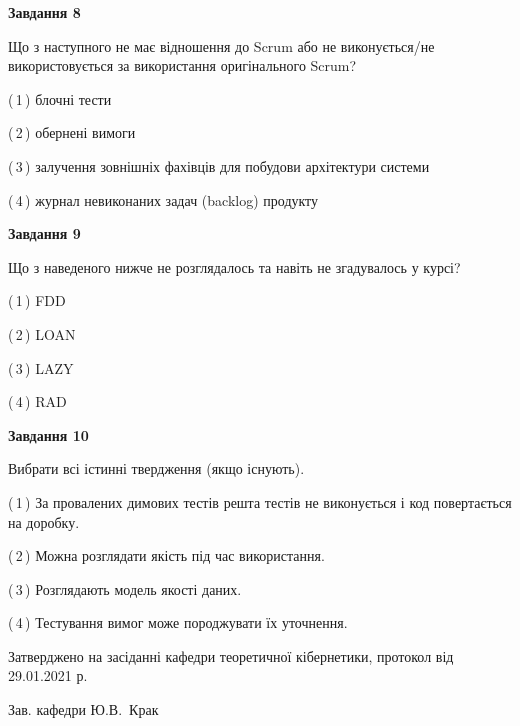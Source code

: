 \documentclass[10pt, ukrainian]{article}
\begin{document}
{\begin {large}
{\begin {center}\textbf{Завдання 8}\end {center}}\par
Що з наступного не має відношення до Scrum або не виконується/не використовується за використання оригінального Scrum?\par
\vspace{2mm}



(\,1\,) блочні тести%



(\,2\,) обернені вимоги%



(\,3\,) залучення зовнішніх фахівців для побудови архітектури системи%



(\,4\,) журнал невиконаних задач (backlog) продукту%


{\begin {center}\textbf{Завдання 9}\end {center}}\par
Що з наведеного нижче не розглядалось та навіть не згадувалось у курсі?\par
\vspace{2mm}



(\,1\,) FDD%



(\,2\,) LOAN%



(\,3\,) LAZY%



(\,4\,) RAD%


{\begin {center}\textbf{Завдання 10}\end {center}}\par
Вибрати всі істинні твердження (якщо існують).\par
\vspace{2mm}



(\,1\,) За провалених димових тестів решта тестів не виконується і код повертається на доробку.%



(\,2\,) Можна розглядати якість під час використання.%



(\,3\,) Розглядають модель якості даних.%



(\,4\,) Тестування вимог може породжувати їх уточнення.%



\end {large}}
{\vspace{5mm}\smallskip \begin {small} Затверджено на засіданні кафедри теоретичної кібернетики, протокол  від   29.01.2021 р.\par\smallskip\smallskip
{\parbox {6.5 cm}{Зав. кафедри \dotfill Ю.В.~Крак}} \end{small}}
\newpage
\end{document}
